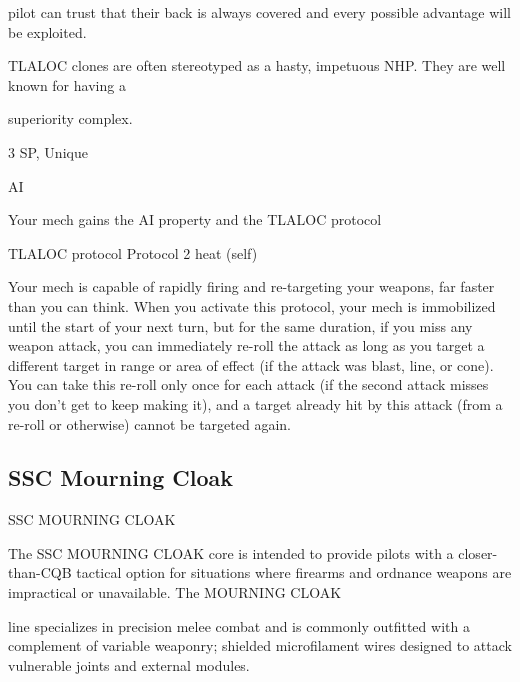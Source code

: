pilot can trust that their back is always covered and every possible advantage will be exploited.   

TLALOC clones are often stereotyped as a hasty, impetuous NHP. They are well known for having a  

superiority complex.  

3 SP, Unique
 

AI
 
Your mech gains the AI property and the TLALOC protocol
 

TLALOC protocol  
Protocol  
2 heat (self)
 
Your mech is capable of rapidly firing and re-targeting your weapons, far faster than you can  
think. When you activate this protocol, your mech is immobilized until the start of your next turn,  
but for the same duration, if you miss any weapon attack, you can immediately re-roll the attack  
as long as you target a different target in range or area of effect (if the attack was blast, line, or  
cone). You can take this re-roll only once for each attack (if the second attack misses you don’t  
get to keep making it), and a target already hit by this attack (from a re-roll or otherwise) cannot  
be targeted again.
 

                                                                                                                     


                                                                                                                            

                                                                                                                      
\subsection{SSC Mourning Cloak}

                                    SSC MOURNING CLOAK  

The SSC MOURNING CLOAK core is intended to provide pilots with a closer-than-CQB tactical option for  
situations where firearms and ordnance weapons are impractical or unavailable. The MOURNING CLOAK  

line specializes in precision melee combat and is commonly outfitted with a complement of variable  
weaponry; shielded microfilament wires designed to attack vulnerable joints and external modules. 
 

